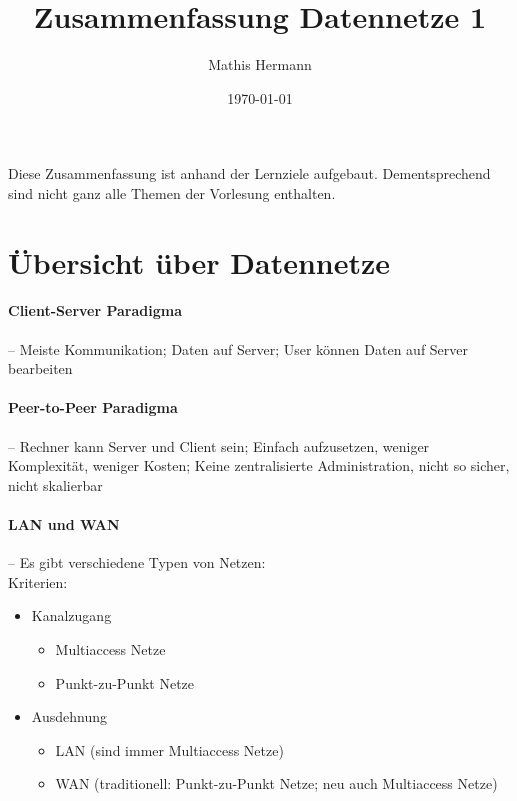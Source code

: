 \documentclass[a4paper,12pt]{article}
\begin{document}
\title{Zusammenfassung Datennetze 1}
\author{Mathis Hermann}
\date{\today}
\maketitle
Diese Zusammenfassung ist anhand der Lernziele aufgebaut. Dementsprechend sind nicht ganz alle Themen der Vorlesung enthalten.

\section{Übersicht über Datennetze}



\paragraph{Client-Server Paradigma} -- Meiste Kommunikation; Daten auf Server; User können Daten auf Server bearbeiten

\paragraph{Peer-to-Peer Paradigma} -- Rechner kann Server und Client sein; Einfach aufzusetzen, weniger Komplexität, weniger Kosten; Keine zentralisierte Administration, nicht so sicher, nicht skalierbar

\paragraph{LAN und WAN} -- Es gibt verschiedene Typen von Netzen:\\
Kriterien:
\begin{itemize}
\item Kanalzugang
\begin{itemize}
\item Multiaccess Netze
\item Punkt-zu-Punkt Netze
\end{itemize}
\item Ausdehnung
\begin{itemize}
\item LAN (sind immer Multiaccess Netze)
\item WAN (traditionell: Punkt-zu-Punkt Netze; neu auch Multiaccess Netze)
\end{itemize}
\end{itemize}
\end{document}
